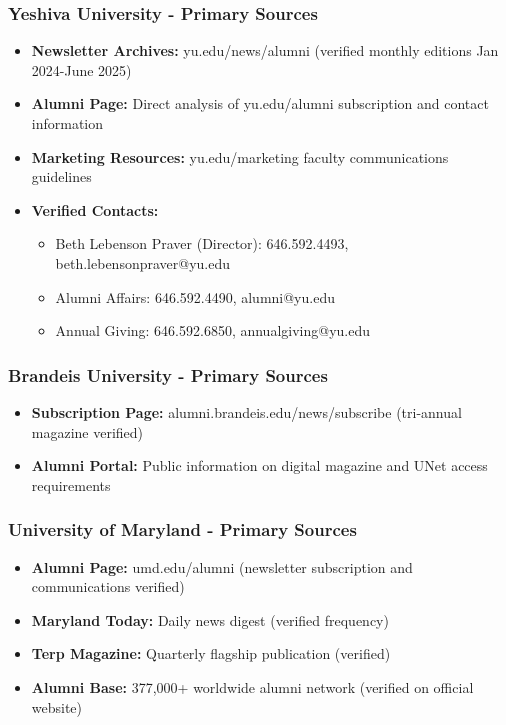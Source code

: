 \documentclass[12pt,letterpaper]{article}
\begin{document}
\subsubsection{Yeshiva University - Primary Sources}
\begin{itemize}[leftmargin=*]
    \item \textbf{Newsletter Archives:} yu.edu/news/alumni (verified monthly editions Jan 2024-June 2025)
    \item \textbf{Alumni Page:} Direct analysis of yu.edu/alumni subscription and contact information
    \item \textbf{Marketing Resources:} yu.edu/marketing faculty communications guidelines
    \item \textbf{Verified Contacts:}
    \begin{itemize}
        \item Beth Lebenson Praver (Director): 646.592.4493, beth.lebensonpraver@yu.edu
        \item Alumni Affairs: 646.592.4490, alumni@yu.edu
        \item Annual Giving: 646.592.6850, annualgiving@yu.edu
    \end{itemize}
\end{itemize}

\subsubsection{Brandeis University - Primary Sources}
\begin{itemize}[leftmargin=*]
    \item \textbf{Subscription Page:} alumni.brandeis.edu/news/subscribe (tri-annual magazine verified)
    \item \textbf{Alumni Portal:} Public information on digital magazine and UNet access requirements
\end{itemize}

\subsubsection{University of Maryland - Primary Sources}
\begin{itemize}[leftmargin=*]
    \item \textbf{Alumni Page:} umd.edu/alumni (newsletter subscription and communications verified)
    \item \textbf{Maryland Today:} Daily news digest (verified frequency)
    \item \textbf{Terp Magazine:} Quarterly flagship publication (verified)
    \item \textbf{Alumni Base:} 377,000+ worldwide alumni network (verified on official website)
\end{itemize}
\end{document}
